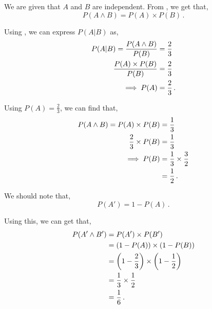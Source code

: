 \begin{subquestions}
\subquestion

\begin{subsubquestions}
	
\subsubquestion
	
We are given that $A$ and $B$ are independent. From , we get that,
\begin{equation}
	P(A \land B) = P (A) \times P(B) \,.
\end{equation}

Using , we can express $P(A|B)$ as,
\begin{align}
	P(A|B) = \frac{P(A \land B)}{P(B)} & = \frac{2}{3} \nonumber \\
	         \frac{P(A) \times P(B)}{P(B)} & = \frac{2}{3} \nonumber \\
	         \implies P(A) & = \frac{2}{3} \,.
\end{align}
	

\subsubquestion

Using $P(A)=\frac{2}{3}$, we can find that,
\begin{align}
	P(A \land B) = P (A) \times P(B) & = \frac{1}{3} \nonumber \\
	                \frac{2}{3} \times P(B) & = \frac{1}{3} \nonumber \\
	                \implies P(B) & = \frac{1}{3} \times \frac{3}{2} \nonumber \\
	                              & = \frac{1}{2} \,.
\end{align}


\subsubquestion

We should note that,
\begin{equation}
	P(A') = 1 - P(A) \,.
\end{equation}

Using this, we can get that,
\begin{align}
	P(A' \land B') & = P(A') \times P(B') \nonumber \\
	               & = (1-P(A)) \times (1-P(B)) \nonumber \\
	               & = \left(1 - \frac{2}{3}\right) \times \left(1 - \frac{1}{2}\right) \nonumber \\
	               & = \frac{1}{3} \times \frac{1}{2} \nonumber \\
	               & = \frac{1}{6} \,.
\end{align}


\end{subsubquestions}
\end{subquestions}
